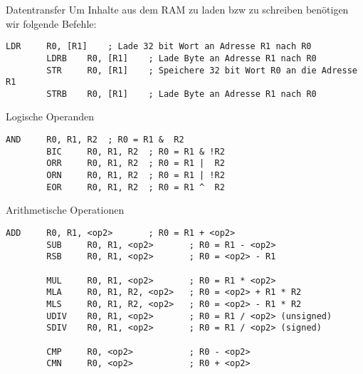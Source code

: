 \begin{defi}{Datentransfer}
    Um Inhalte aus dem RAM zu laden bzw zu schreiben benötigen wir folgende Befehle:

    \begin{lstlisting}[language={[x86masm]Assembler}]
        LDR     R0, [R1]    ; Lade 32 bit Wort an Adresse R1 nach R0
        LDRB    R0, [R1]    ; Lade Byte an Adresse R1 nach R0
        STR     R0, [R1]    ; Speichere 32 bit Wort R0 an die Adresse R1
        STRB    R0, [R1]    ; Lade Byte an Adresse R1 nach R0
    \end{lstlisting}
\end{defi}

\begin{defi}{Logische Operanden}
    \begin{lstlisting}[language={[x86masm]Assembler}]
        AND     R0, R1, R2  ; R0 = R1 &  R2
        BIC     R0, R1, R2  ; R0 = R1 & !R2
        ORR     R0, R1, R2  ; R0 = R1 |  R2
        ORN     R0, R1, R2  ; R0 = R1 | !R2
        EOR     R0, R1, R2  ; R0 = R1 ^  R2
    \end{lstlisting}
\end{defi}

\begin{defi}{Arithmetische Operationen}
    \begin{lstlisting}[language={[x86masm]Assembler}]
        ADD     R0, R1, <op2>       ; R0 = R1 + <op2>
        SUB     R0, R1, <op2>       ; R0 = R1 - <op2>
        RSB     R0, R1, <op2>       ; R0 = <op2> - R1

        MUL     R0, R1, <op2>       ; R0 = R1 * <op2>
        MLA     R0, R1, R2, <op2>   ; R0 = <op2> + R1 * R2
        MLS     R0, R1, R2, <op2>   ; R0 = <op2> - R1 * R2
        UDIV    R0, R1, <op2>       ; R0 = R1 / <op2> (unsigned)
        SDIV    R0, R1, <op2>       ; R0 = R1 / <op2> (signed)

        CMP     R0, <op2>           ; R0 - <op2>
        CMN     R0, <op2>           ; R0 + <op2>
    \end{lstlisting}
\end{defi}

